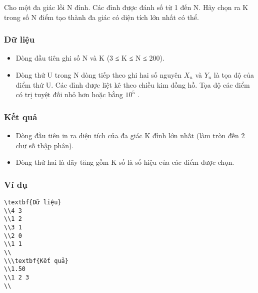 







   Cho một đa giác lồi N đỉnh. Các đỉnh được đánh số từ 1 đến N. Hãy chọn ra K trong số N điểm tạo thành đa giác có diện tích lớn nhất có thể.  

\subsubsection{   Dữ liệu  }
\begin{itemize}
	\item     Dòng đầu tiên ghi số N và K (3 ≤ K ≤ N ≤ 200).   
	\item     Dòng thứ U trong N dòng tiếp theo ghi hai số nguyên $X_{u}$    và $Y_{u}$    là tọa độ của điểm thứ U. Các đỉnh được liệt kê theo chiều kim đồng hồ. Tọa độ các điểm có trị tuyệt đối nhỏ hơn hoặc bằng $10^{5}$    .   
\end{itemize}

\subsubsection{   Kết quả  }
\begin{itemize}
	\item     Dòng đầu tiên in ra diện tích của đa giác K đỉnh lớn nhất (làm tròn đến 2 chữ số thập phân).   
	\item     Dòng thứ hai là dãy tăng gồm K số là số hiệu của các điểm được chọn.   
\end{itemize}

\subsubsection{   Ví dụ  }
\begin{verbatim}
\textbf{Dữ liệu}
\\4 3
\\1 2
\\3 1
\\2 0
\\1 1
\\
\\\textbf{Kết quả}
\\1.50
\\1 2 3
\\\end{verbatim}

